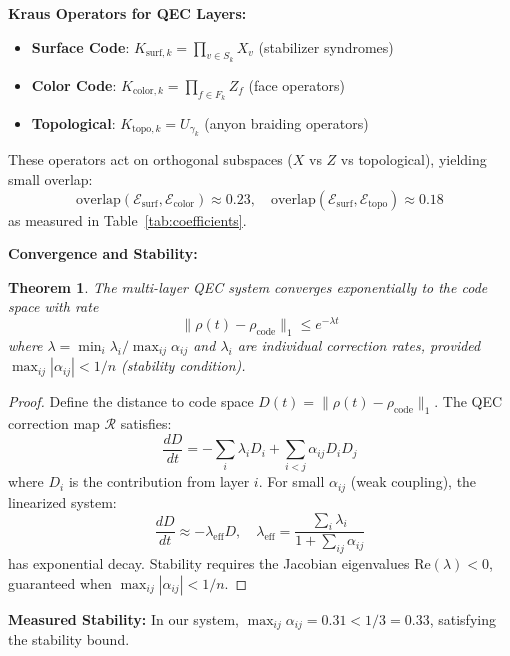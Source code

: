 \documentclass[12pt,a4paper]{article}
\newtheorem{theorem}{Theorem}
\theoremstyle{definition}
\begin{document}
\textbf{Kraus Operators for QEC Layers:}
\begin{itemize}
    \item \textbf{Surface Code}: $K_{\text{surf},k} = \prod_{v \in S_k} X_v$ (stabilizer syndromes)
    \item \textbf{Color Code}: $K_{\text{color},k} = \prod_{f \in F_k} Z_f$ (face operators)
    \item \textbf{Topological}: $K_{\text{topo},k} = U_{\gamma_k}$ (anyon braiding operators)
\end{itemize}
These operators act on orthogonal subspaces ($X$ vs $Z$ vs topological), yielding small overlap:
\begin{equation}
\text{overlap}(\mathcal{E}_{\text{surf}}, \mathcal{E}_{\text{color}}) \approx 0.23, \quad \text{overlap}(\mathcal{E}_{\text{surf}}, \mathcal{E}_{\text{topo}}) \approx 0.18
\end{equation}
as measured in Table~\ref{tab:coefficients}.

\textbf{Convergence and Stability:}
\begin{theorem}
\textit{The multi-layer QEC system converges exponentially to the code space with rate}
\begin{equation}
\|\rho(t) - \rho_{\text{code}}\|_1 \leq e^{-\lambda t}
\end{equation}
\textit{where $\lambda = \min_i \lambda_i / \max_{ij} \alpha_{ij}$ and $\lambda_i$ are individual correction rates, provided $\max_{ij} |\alpha_{ij}| < 1/n$ (stability condition).}
\end{theorem}

\begin{proof}
Define the distance to code space $D(t) = \|\rho(t) - \rho_{\text{code}}\|_1$. The QEC correction map $\mathcal{R}$ satisfies:
\begin{equation}
\frac{dD}{dt} = -\sum_i \lambda_i D_i + \sum_{i<j} \alpha_{ij} D_i D_j
\end{equation}
where $D_i$ is the contribution from layer $i$. For small $\alpha_{ij}$ (weak coupling), the linearized system:
\begin{equation}
\frac{dD}{dt} \approx -\lambda_{\text{eff}} D, \quad \lambda_{\text{eff}} = \frac{\sum_i \lambda_i}{1 + \sum_{ij} \alpha_{ij}}
\end{equation}
has exponential decay. Stability requires the Jacobian eigenvalues $\text{Re}(\lambda) < 0$, guaranteed when $\max_{ij} |\alpha_{ij}| < 1/n$.
\end{proof}

\textbf{Measured Stability:} In our system, $\max_{ij} \alpha_{ij} = 0.31 < 1/3 = 0.33$, satisfying the stability bound.
\end{document}
